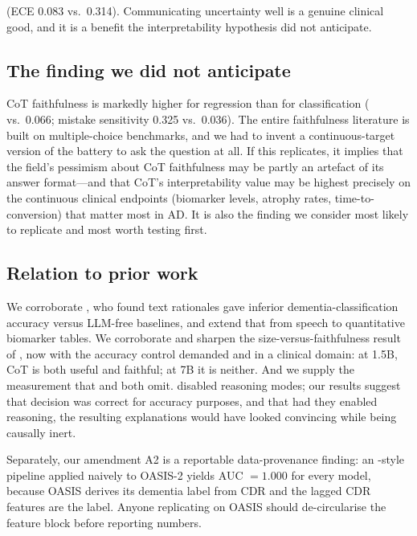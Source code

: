  (ECE 0.083 vs.\ 0.314). Communicating
uncertainty well is a genuine clinical good, and it is a benefit the interpretability hypothesis did
not anticipate.

\subsection{The finding we did not anticipate}

CoT faithfulness is markedly higher for regression than for classification ( vs.\ 0.066;
mistake sensitivity 0.325 vs.\ 0.036). The entire faithfulness literature is built on
multiple-choice benchmarks, and we had to invent a continuous-target version of the battery to ask
the question at all. If this replicates, it implies that the field's pessimism about CoT
faithfulness may be partly an artefact of its answer format---and that CoT's interpretability value
may be highest precisely on the continuous clinical endpoints (biomarker levels, atrophy rates,
time-to-conversion) that matter most in AD. It is also the finding we consider most likely to
replicate and most worth testing first.

\subsection{Relation to prior work}

We corroborate \citet{anon2026dementiaspeech}, who found text rationales gave inferior
dementia-classification accuracy versus LLM-free baselines, and extend that from speech to
quantitative biomarker tables. We corroborate and sharpen the size-versus-faithfulness result of
\citet{lanham2023faithfulness}, now with the accuracy control \citet{bentham2024disguised} demanded
and in a clinical domain: at 1.5B, CoT is both useful and faithful; at 7B it is neither. And we
supply the measurement that \citet{ding2025l2ctabpfn} and \citet{kearney2026tapgpt} both omit.
\citet{kearney2026tapgpt} disabled reasoning modes; our results suggest that decision was correct
for accuracy purposes, and that had they enabled reasoning, the resulting explanations would have
looked convincing while being causally inert.

Separately, our amendment A2 is a reportable data-provenance finding: an \ltoc-style pipeline
applied naively to OASIS-2 yields AUC $=1.000$ for every model, because OASIS derives its dementia
label from CDR and the lagged CDR features are the label. Anyone replicating
\citet{ding2025l2ctabpfn} on OASIS should de-circularise the feature block before reporting numbers.

